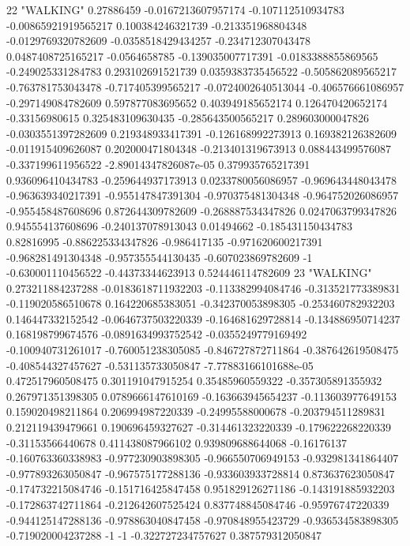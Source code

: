 22 "WALKING" 0.27886459 -0.0167213607957174 -0.107112510934783 -0.00865921919565217 0.100384246321739 -0.213351968804348 -0.0129769320782609 -0.0358518429434257 -0.234712307043478 0.0487408725165217 -0.0564658785 -0.139035007717391 -0.0183388855869565 -0.249025331284783 0.293102691521739 0.0359383735456522 -0.505862089565217 -0.763781753043478 -0.717405399565217 -0.0724002640513044 -0.406576661086957 -0.297149084782609 0.597877083695652 0.403949185652174 0.126470420652174 -0.33156980615 0.325483109630435 -0.285643500565217 0.289603000047826 -0.0303551397282609 0.219348933417391 -0.126168992273913 0.169382126382609 -0.011915409626087 0.202000471804348 -0.213401319673913 0.088443499576087 -0.337199611956522 -2.89014347826087e-05 0.379935765217391 0.936096410434783 -0.259644937173913 0.0233780056086957 -0.969643448043478 -0.963639340217391 -0.955147847391304 -0.970375481304348 -0.964752026086957 -0.955458487608696 0.872644309782609 -0.268887534347826 0.0247063799347826 0.945554137608696 -0.240137078913043 0.01494662 -0.185431150434783 0.82816995 -0.886225334347826 -0.986417135 -0.971620600217391 -0.968281491304348 -0.957355544130435 -0.607023869782609 -1 -0.630001110456522 -0.44373344623913 0.524446114782609
23 "WALKING" 0.273211884237288 -0.0183618711932203 -0.113382994084746 -0.313521773389831 -0.119020586510678 0.164220685383051 -0.342370053898305 -0.253460782932203 0.146447332152542 -0.0646737503220339 -0.164681629728814 -0.134886950714237 0.168198799674576 -0.0891634993752542 -0.0355249779169492 -0.100940731261017 -0.760051238305085 -0.846727872711864 -0.387642619508475 -0.408544327457627 -0.531135733050847 -7.77883166101688e-05 0.472517960508475 0.301191047915254 0.35485960559322 -0.357305891355932 0.267971351398305 0.0789666147610169 -0.163663945654237 -0.113603977649153 0.159020498211864 0.206994987220339 -0.24995588000678 -0.203794511289831 0.212119439479661 0.190696459327627 -0.314461323220339 -0.179622268220339 -0.31153566440678 0.411438087966102 0.939809688644068 -0.16176137 -0.160763360338983 -0.977230903898305 -0.966550706949153 -0.932981341864407 -0.977893263050847 -0.967575177288136 -0.933603933728814 0.873637623050847 -0.174732215084746 -0.151716425847458 0.951829126271186 -0.143191885932203 -0.172863742711864 -0.212642607525424 0.837748845084746 -0.95976747220339 -0.944125147288136 -0.978863040847458 -0.970848955423729 -0.936534583898305 -0.719020004237288 -1 -1 -0.322727234757627 0.387579312050847
